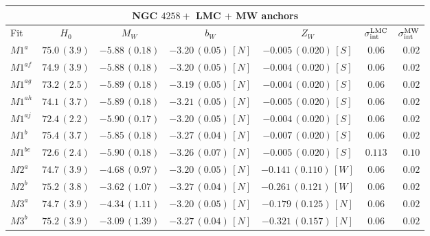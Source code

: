 \begin{table}[tbp]
\centering
\begin{tabular}{@{}lcccccr}
\hline
\multicolumn{7}{c}{NGC $4258 +$ LMC $+$ MW anchors} \\
\hline
Fit & $H_0$ & $M_W$ & $b_W$ & $Z_W$ &$\sigma_{\mathrm{int}}^{\mathrm{LMC}}$ & $\sigma_{\mathrm{int}}^{\mathrm{MW}}$\\
\hline
$M1^{a}$ & $75.0\,(3.9)$ & $-5.88\,(0.18)$ & $-3.20\,(0.05)\,[N]$ & $-0.005\,(0.020)\,[S]$ & $0.06$& $0.02$ \\
$M1^{af}$ & $74.9\,(3.9)$ & $-5.88\,(0.18)$ & $-3.20\,(0.05)\,[N]$ & $-0.004\,(0.020)\,[S]$ & $0.06$& $0.02$ \\
$M1^{ag}$ & $73.2\,(2.5)$ & $-5.89\,(0.18)$ & $-3.19\,(0.05)\,[N]$ & $-0.004\,(0.020)\,[S]$ & $0.06$& $0.02$ \\
$M1^{ah}$ & $74.1\,(3.7)$ & $-5.89\,(0.18)$ & $-3.21\,(0.05)\,[N]$ & $-0.005\,(0.020)\,[S]$ & $0.06$& $0.02$ \\
$M1^{aj}$ & $72.4\,(2.2)$ & $-5.90\,(0.17)$ & $-3.20\,(0.05)\,[N]$ & $-0.004\,(0.020)\,[S]$ & $0.06$& $0.02$ \\
$M1^{b}$ & $75.4\,(3.7)$ & $-5.85\,(0.18)$ & $-3.27\,(0.04)\,[N]$ & $-0.007\,(0.020)\,[S]$ & $0.06$ & $0.02$ \\
$M1^{be}$ & $72.6\,(2.4)$ & $-5.90\,(0.18)$ & $-3.26\,(0.07)\,[N]$ & $-0.005\,(0.020)\,[S]$ & $0.113$ & $0.10$ \\
$M2^{a}$ & $74.7\,(3.9)$ & $-4.68\,(0.97)$ & $-3.20\,(0.05)\,[N] $ & $-0.141\,(0.110)\,[W] $ & $0.06 $ & $0.02 $ \\
$M2^{b}$ & $ 75.2\,(3.8)$ & $-3.62\,(1.07)$ & $-3.27\,(0.04)\,[N]$ & $-0.261\,(0.121)\,[W]$ & $0.06$ & $0.02$ \\
$M3^{a}$ & $74.7\,(3.9)$ & $-4.34\,(1.11)$ & $-3.20\,(0.05)\,[N]$ & $-0.179\,(0.125)\,[N]$ & $0.06$ & $0.02$ \\
$M3^{b}$ & $75.2\,(3.9)$ & $-3.09\,(1.39)$ & $-3.27\,(0.04)\,[N]$ & $-0.321\,(0.157)\,[N]$ & $0.06$ & $0.02$ \\
\hline
\end{tabular}

\end{table}
